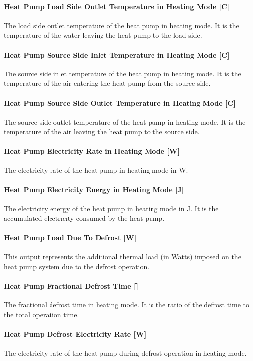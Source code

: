 \paragraph{Heat Pump Load Side Outlet Temperature in Heating Mode {[}C{]}} The
load side outlet temperature of the heat pump in heating mode. It is the
temperature of the water leaving the heat pump to the load side.
\paragraph{Heat Pump Source Side Inlet Temperature in Heating Mode {[}C{]}} The
source side inlet temperature of the heat pump in heating mode. It is the
temperature of the air entering the heat pump from the source side.
\paragraph{Heat Pump Source Side Outlet Temperature in Heating Mode {[}C{]}} The
source side outlet temperature of the heat pump in heating mode. It is the
temperature of the air leaving the heat pump to the source side.
\paragraph{Heat Pump Electricity Rate in Heating Mode {[}W{]}} The electricity
rate of the heat pump in heating mode in W.
\paragraph{Heat Pump Electricity Energy in Heating Mode {[}J{]}} The electricity
energy of the heat pump in heating mode in J. It is the accumulated electricity
consumed by the heat pump.
\paragraph{Heat Pump Load Due To Defrost {[}W{]}}
This output represents the additional thermal load (in Watts) imposed on the heat pump
system due to the defrost operation.
\paragraph{Heat Pump Fractional Defrost Time {[}{]}} The fractional defrost
time in heating mode. It is the ratio of the defrost time to the total operation
time.
\paragraph{Heat Pump Defrost Electricity Rate {[}W{]}} The electricity rate of
the heat pump during defrost operation in heating mode.

